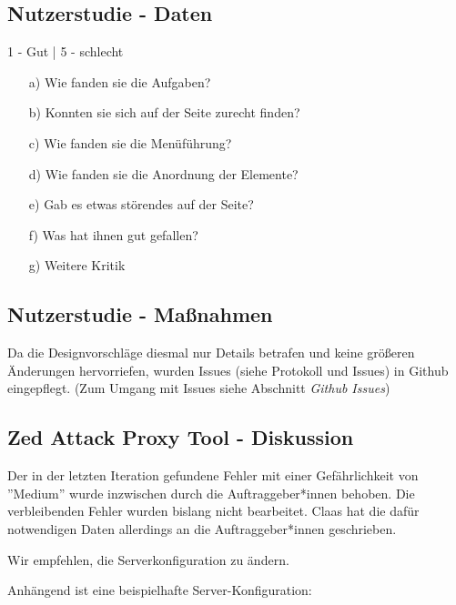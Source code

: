 \documentclass[accentcolor=tud0b,12pt,paper=a4]{tudreport}
\begin{document}
	\subsection*{Nutzerstudie - Daten}
	\begin{adjustbox}{max width=\textwidth}
	\end{adjustbox}
	\newline
	\begin{footnotesize} 1 - Gut | 5 - schlecht \end{footnotesize}
	\begin{itemize}
		\item[a)] Wie fanden sie die Aufgaben?
		\item[b)] Konnten sie sich auf der Seite zurecht finden?
		\item[c)] Wie fanden sie die Menüführung?
		\item[d)] Wie fanden sie die Anordnung der Elemente?
		\item[e)] Gab es etwas störendes auf der Seite?
		\item[f)] Was hat ihnen gut gefallen?
		\item[g)] Weitere Kritik
	\end{itemize}

	\subsection*{Nutzerstudie - Maßnahmen}
	Da die Designvorschläge diesmal nur Details betrafen und keine größeren Änderungen hervorriefen, wurden Issues (siehe Protokoll und Issues) in Github eingepflegt. (Zum Umgang mit Issues siehe Abschnitt \emph{Github Issues})

	\subsection*{Zed Attack Proxy Tool - Diskussion}
	Der in der letzten Iteration gefundene Fehler mit einer Gefährlichkeit von ''Medium'' wurde inzwischen durch die Auftraggeber*innen behoben. Die verbleibenden Fehler wurden bislang nicht bearbeitet. Claas hat die dafür notwendigen Daten allerdings an die Auftraggeber*innen geschrieben.

	Wir empfehlen, die Serverkonfiguration zu ändern.

	Anhängend ist eine beispielhafte Server-Konfiguration:

	
\end{document}
